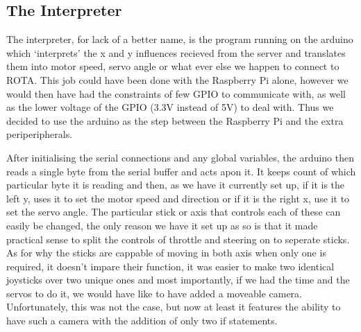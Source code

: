 \subsection{The Interpreter}
\par The interpreter, for lack of a better name, is the program running on the arduino
which `interprets' the x and y influences recieved from the server and translates them
into motor speed, servo angle or what ever else we happen to connect to ROTA.
This job could have been done with the Raspberry Pi alone, however we would then have
had the constraints of few GPIO to communicate with, as well as the lower voltage of
the GPIO (3.3V instead of 5V) to deal with. Thus we decided to use the arduino as the
step between the Raspberry Pi and the extra periperipherals.
\par After initialising the serial connections and any global variables, the arduino then
reads a single byte from the serial buffer and acts apon it. It keeps count of which particular
byte it is reading and then, as we have it currently set up, if it is the left y, uses
it to set the motor speed and direction or if it is the right x, use it to set the
servo angle. The particular stick or axis that controls each of these can easily be changed,
the only reason we have it set up as so is that it made practical sense to split
the controls of throttle and steering on to seperate sticks. As for why the sticks
are cappable of moving in both axis when only one is required, it doesn't impare their
function, it was easier to make two identical joysticks over two unique ones and
most importantly, if we had the time and the servos to do it, we would have like to
have added a moveable camera. Unfortunately, this was not the case, but now at least
it features the ability to have such a camera with the addition of only two if statements.
